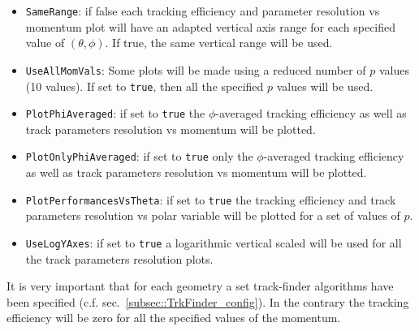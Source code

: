 \begin{itemize}
  \item {\tt SameRange}: if false each tracking efficiency and parameter resolution vs momentum plot will have an adapted vertical axis range for each specified value of $(\theta,\phi)$. 
  If true, the same vertical range will be used.
  
  \item {\tt UseAllMomVals}: Some plots will be made using a reduced number of $p$ values (10 values). If set to {\tt true}, then all the specified $p$ values will be used.
  
  \item {\tt PlotPhiAveraged}: if set to {\tt true} the $\phi$-averaged tracking efficiency as well as track parameters resolution vs momentum will be plotted.
  
  \item {\tt PlotOnlyPhiAveraged}: if set to {\tt true} only the $\phi$-averaged tracking efficiency as well as track parameters resolution vs momentum will be plotted.
  
  \item {\tt PlotPerformancesVsTheta}: if set to {\tt true} the tracking efficiency and track parameters resolution vs polar variable will be plotted for a set of values of $p$.
  
  \item {\tt UseLogYAxes}: if set to {\tt true} a logarithmic vertical scaled will be used for all the track parameters resolution plots.
  
\end{itemize}

It is very important that for each geometry a set track-finder algorithms have been specified (c.f. sec.~\ref{subsec::TrkFinder_config}). In the contrary the 
tracking efficiency will be zero for all the specified values of the momentum.



